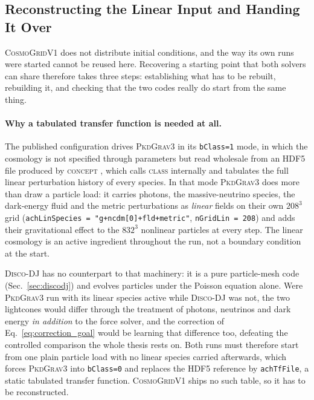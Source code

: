 \documentclass{report}
\begin{document}
\subsection{Reconstructing the Linear Input and Handing It Over}
\label{subsec:ic_linear}
\label{subsec:ic_why_tk}
\label{subsec:ic_neutrinos}
\label{subsec:ic_handoff}

\textsc{CosmoGridV1} does not distribute initial conditions, and the way its own runs were
started cannot be reused here. Recovering a starting point that both solvers can share
therefore takes three steps: establishing what has to be rebuilt, rebuilding it, and
checking that the two codes really do start from the same thing.

\paragraph{Why a tabulated transfer function is needed at all.} The published
configuration drives \textsc{PkdGrav3} in its \texttt{bClass=1} mode, in which the
cosmology is not specified through parameters but read wholesale from an HDF5 file
produced by \textsc{concept} \cite{dakin_cosmological_2022}, which calls \textsc{class}
internally and tabulates the full linear perturbation history of every species. In that
mode \textsc{PkdGrav3} does more than draw a particle load: it carries photons, the
massive-neutrino species, the dark-energy fluid and the metric perturbations as
\emph{linear} fields on their own $208^3$ grid
(\texttt{achLinSpecies = "g+ncdm[0]+fld+metric"}, \texttt{nGridLin = 208}) and adds
their gravitational effect to the $832^3$ nonlinear particles at every step. The linear
cosmology is an active ingredient throughout the run, not a boundary condition at the
start.

\textsc{Disco-DJ} has no counterpart to that machinery: it is a pure particle-mesh code
(Sec.~\ref{sec:discodj}) and evolves particles under the Poisson equation alone. Were
\textsc{PkdGrav3} run with its linear species active while \textsc{Disco-DJ} was not, the two
lightcones would differ through the treatment of photons, neutrinos and dark energy
\emph{in addition} to the force solver, and the correction of
Eq.~\eqref{eq:correction_goal} would be learning that difference too, defeating the
controlled comparison the whole thesis rests on. Both runs must therefore start from
one plain particle load with no linear species carried afterwards, which forces
\textsc{PkdGrav3} into \texttt{bClass=0} and replaces the HDF5 reference by
\texttt{achTfFile}, a static tabulated transfer function. \textsc{CosmoGridV1} ships no such
table, so it has to be reconstructed.
\end{document}

